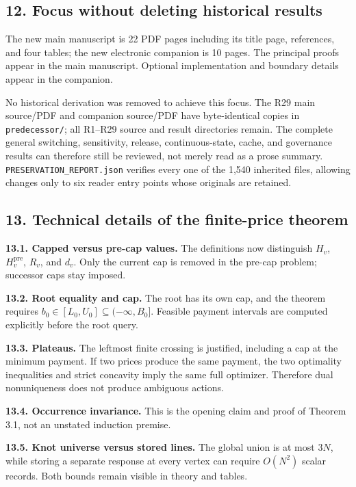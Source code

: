 \documentclass[
  11pt,
]{article}
\begin{document}
\subsection{12. Focus without deleting historical
results}\label{focus-without-deleting-historical-results}

The new main manuscript is 22 PDF pages including its title page,
references, and four tables; the new electronic companion is 10 pages.
The principal proofs appear in the main manuscript. Optional
implementation and boundary details appear in the companion.

No historical derivation was removed to achieve this focus. The R29 main
source/PDF and companion source/PDF have byte-identical copies in
\texttt{predecessor/}; all R1--R29 source and result directories remain.
The complete general switching, sensitivity, release, continuous-state,
cache, and governance results can therefore still be reviewed, not
merely read as a prose summary. \texttt{PRESERVATION\_REPORT.json}
verifies every one of the 1,540 inherited files, allowing changes only
to six reader entry points whose originals are retained.

\subsection{13. Technical details of the finite-price
theorem}\label{technical-details-of-the-finite-price-theorem}

\textbf{13.1. Capped versus pre-cap values.} The definitions now
distinguish \(H_v\), \(H_v^{\mathrm{pre}}\), \(R_v\), and \(d_v\). Only
the current cap is removed in the pre-cap problem; successor caps stay
imposed.

\textbf{13.2. Root equality and cap.} The root has its own cap, and the
theorem requires \(b_0\in[L_0,U_0]\subseteq(-\infty,B_0]\). Feasible
payment intervals are computed explicitly before the root query.

\textbf{13.3. Plateaus.} The leftmost finite crossing is justified,
including a cap at the minimum payment. If two prices produce the same
payment, the two optimality inequalities and strict concavity imply the
same full optimizer. Therefore dual nonuniqueness does not produce
ambiguous actions.

\textbf{13.4. Occurrence invariance.} This is the opening claim and
proof of Theorem 3.1, not an unstated induction premise.

\textbf{13.5. Knot universe versus stored lines.} The global union is at
most \(3N\), while storing a separate response at every vertex can
require \(O(N^2)\) scalar records. Both bounds remain visible in theory
and tables.
\end{document}

